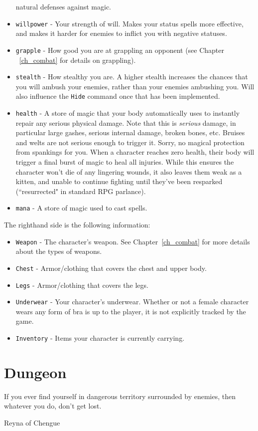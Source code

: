 \documentclass{report}
\begin{document}
\begin{itemize}
    natural defenses against magic.
    \item \verb|willpower| - Your strength of will. Makes your status spells more
    effective, and makes it harder for enemies to inflict you with negative 
    statuses.
    \item \verb|grapple| - How good you are at grappling an opponent (see Chapter
    ~\ref{ch_combat} for details on grappling).
    \item \verb|stealth| - How stealthy you are. A higher stealth increases the 
    chances that you will ambush your enemies, rather than your enemies ambushing
    you. Will also influence the \verb|Hide| command once that has been implemented.
    \item \verb|health| - A store of magic that your body automatically uses to
    instantly repair any serious physical damage. Note that this is \emph{serious}
    damage, in particular large gashes, serious internal damage, broken bones,
    etc. Bruises and welts are not serious enough to trigger it. Sorry, no 
    magical protection from spankings for you. When a character reaches zero health,
    their body will trigger a final burst of magic to heal all injuries. While this ensures
    the character won't die of any lingering wounds, it also leaves them weak as a kitten, and unable to continue fighting until they've been resparked 
    (``resurrected" in standard RPG parlance).
    \item \verb|mana| - A store of magic used to cast spells.
\end{itemize}

    The righthand side is the following information:
\begin{itemize}
    \item \verb|Weapon| - The character's weapon. See Chapter~\ref{ch_combat} for
    more details about the types of weapons.
    \item \verb|Chest| - Armor/clothing that covers the chest and upper body.
    \item \verb|Legs| - Armor/clothing that covers the legs. 
    \item \verb|Underwear| - Your character's underwear. Whether or not a female
    character wears any form of bra is up to the player, it is not explicitly tracked
    by the game.
    \item \verb|Inventory| - Items your character is currently carrying.
\end{itemize}

\chapter{Dungeon}
\label{ch_dungeon}
\epigraph{If you ever find yourself in dangerous territory surrounded by enemies, 
then whatever you do, don't get lost.}{Reyna of Chengue}
\end{document}
